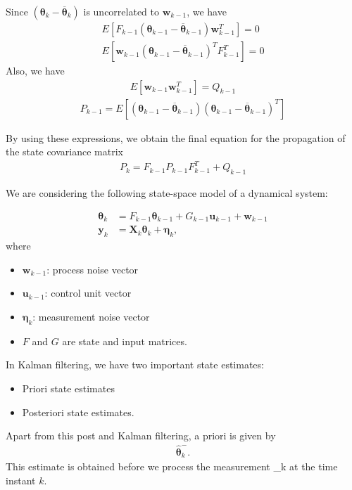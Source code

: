 Since $(\boldsymbol{\theta}_{k}-\overline{\boldsymbol{\theta}}_{k})$ is uncorrelated to $\mathbf{w}_{k-1}$, we have
\begin{align*}
	E[F_{k-1}(\boldsymbol{\theta}_{k-1}-\overline{\boldsymbol{\theta}}_{k-1})\mathbf{w}_{k-1}^{T}]=0 \\E[\mathbf{w}_{k-1}(\boldsymbol{\theta}_{k-1}-\overline{\boldsymbol{\theta}}_{k-1})^{T}F_{k-1}^{T}]=0
\end{align*}
Also, we have
\begin{align*}
	E[\mathbf{w}_{k-1}\mathbf{w}_{k-1}^{T}]=Q_{k-1}
\end{align*}
\begin{align*}
	P_{k-1}=E[(\boldsymbol{\theta}_{k-1}-\overline{\boldsymbol{\theta}}_{k-1})(\boldsymbol{\theta}_{k-1}-\overline{\boldsymbol{\theta}}_{k-1})^{T}]
\end{align*}

By using these expressions, we obtain the final equation for the propagation of the state covariance matrix
\begin{align*}
	P_{k}=F_{k-1}P_{k-1}F_{k-1}^{T}+Q_{k-1}
\end{align*}




We are considering the following state-space model of a dynamical system:

\begin{align*}
	\boldsymbol{\theta}_{k}&=F_{k-1}\boldsymbol{\theta}_{k-1}+G_{k-1}\mathbf{u}_{k-1}+\mathbf{w}_{k-1} \\
	\mathbf{y}_{k}& = \mathbf{X}_{k}\boldsymbol{\theta}_{k}+\boldsymbol{\eta}_{k},
\end{align*}
where
\begin{itemize}
	\item $\mathbf{w}_{k-1}$: process noise vector
	\item $\mathbf{u}_{k-1}$: control unit vector
	\item $\boldsymbol{\eta}_{k}$: measurement noise vector
	\item $F$ and $G$ are state and input matrices.
\end{itemize}


In Kalman filtering, we have two important state estimates: 
\begin{itemize}
	\item Priori state estimates
	\item Posteriori state estimates. 
\end{itemize}
Apart from this post and Kalman filtering, a priori is given by
\begin{align*}
	\hat{\boldsymbol{\theta}}_{k}^{-}.
\end{align*}
This estimate is obtained before we process the measurement _{k} at the time instant $k$.

